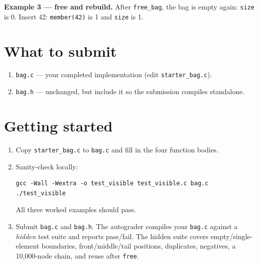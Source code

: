 \documentclass[11pt]{article}
\begin{document}
\textbf{Example 3 --- free and rebuild.} After \texttt{free\_bag}, the bag is empty again: \texttt{size} is 0. Insert 42: \texttt{member(42)} is 1 and \texttt{size} is 1.

\section{What to submit}

\begin{enumerate}
  \item \texttt{bag.c} --- your completed implementation (edit \texttt{starter\_bag.c}).
  \item \texttt{bag.h} --- unchanged, but include it so the submission compiles standalone.
\end{enumerate}

\section{Getting started}

\begin{enumerate}
  \item Copy \texttt{starter\_bag.c} to \texttt{bag.c} and fill in the four function bodies.
  \item Sanity-check locally:
\begin{verbatim}
gcc -Wall -Wextra -o test_visible test_visible.c bag.c
./test_visible
\end{verbatim}
    All three worked examples should pass.
  \item Submit \texttt{bag.c} and \texttt{bag.h}. The autograder compiles your \texttt{bag.c} against a \emph{hidden} test suite and reports pass/fail. The hidden suite covers empty/single-element boundaries, front/middle/tail positions, duplicates, negatives, a 10{,}000-node chain, and reuse after \texttt{free}.
\end{enumerate}
\end{document}
